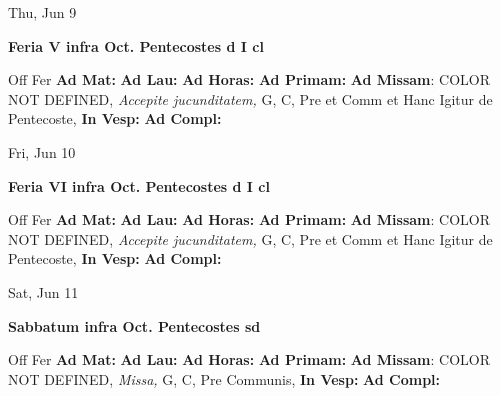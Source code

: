\documentclass[10pt]{book}
\begin{document}
\begin{center}
\begin{minipage}{3.5in}
\vspace{2em}
\begin{center}Thu, Jun 9
\end{center}
\textbf{ \large Feria V infra Oct. Pentecostes
\textnormal{\normalsize d I cl}}

\begin{justify}Off Fer
\textbf{Ad Mat: }
\textbf{Ad Lau: }
\textbf{Ad Horas: }
\textbf{Ad Primam: }\textbf{Ad Missam}: COLOR NOT DEFINED, \textit{Accepite jucunditatem,} G, C, Pre et Comm et Hanc Igitur de Pentecoste, 
\textbf{In Vesp: }
\textbf{Ad Compl: }
\end{justify}
\end{minipage}
\end{center}

\begin{center}
\begin{minipage}{3.5in}
\vspace{2em}
\begin{center}Fri, Jun 10
\end{center}
\textbf{ \large Feria VI infra Oct. Pentecostes
\textnormal{\normalsize d I cl}}

\begin{justify}Off Fer
\textbf{Ad Mat: }
\textbf{Ad Lau: }
\textbf{Ad Horas: }
\textbf{Ad Primam: }\textbf{Ad Missam}: COLOR NOT DEFINED, \textit{Accepite jucunditatem,} G, C, Pre et Comm et Hanc Igitur de Pentecoste, 
\textbf{In Vesp: }
\textbf{Ad Compl: }
\end{justify}
\end{minipage}
\end{center}

\begin{center}
\begin{minipage}{3.5in}
\vspace{2em}
\begin{center}Sat, Jun 11
\end{center}
\textbf{ \large Sabbatum infra Oct. Pentecostes
\textnormal{\normalsize sd}}

\begin{justify}Off Fer
\textbf{Ad Mat: }
\textbf{Ad Lau: }
\textbf{Ad Horas: }
\textbf{Ad Primam: }\textbf{Ad Missam}: COLOR NOT DEFINED, \textit{Missa,} G, C, Pre Communis, 
\textbf{In Vesp: }
\textbf{Ad Compl: }
\end{justify}
\end{minipage}
\end{center}
\end{document}
